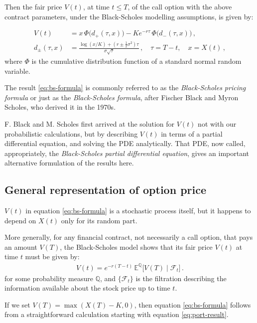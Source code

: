 \documentclass[12pt]{article}
\newcommand{\sF}{\mathcal{F}}
\newcommand{\EQ}{\mathbb{E}^\mathbb{Q}}
\newcommand{\PQ}{\mathbb{Q}}
\begin{document}
Then the fair price $V(t)$, at time $t \leq T$, of the 
call option with the above contract parameters,
under the Black-Scholes modelling assumptions,
is given by:

\begin{equation}\label{eq:bs-formula}
\begin{split}
V(t) &= x \, \Phi\bigl( d_+( \tau, x ) \bigr)
- K e^{-r\tau} \, \Phi\bigl( d_-(\tau, x) \bigr)\,, \\
d_\pm (\tau, x) &= \frac{ \log(x/K) + (r \pm \tfrac12 \sigma^2) \tau }{\sigma \sqrt{\tau} }\,, \quad \tau  = T-t, \quad x = X(t)\,,
\end{split}
\end{equation}
where $\Phi$ is the cumulative distribution function of a standard normal random variable.


The result \eqref{eq:bs-formula}
is commonly referred to as the \emph{Black-Scholes pricing formula}
or just as the \emph{Black-Scholes formula},
after Fischer Black and Myron Scholes, who derived it in the 1970s.

F. Black and M. Scholes first arrived at the solution for $V(t)$
not with our probabilistic calculations,
but by describing $V(t)$ in terms of a 
partial differential equation, and solving the PDE analytically.  
That PDE, now called, appropriately, 
the \emph{Black-Scholes partial differential equation},
gives an important alternative formulation of the results here.

\subsection{General representation of option price}

$V(t)$ in equation \eqref{eq:bs-formula} is a stochastic process itself, 
but it happens to depend on $X(t)$ only
for its random part.

More generally, for any financial contract, not necessarily
a call option, that pays an amount $V(T)$,
the Black-Scholes model shows that its fair price $V(t)$
at time $t$
must be given by:
\begin{align}\label{eq:port-result}
V(t) = e^{-r(T-t)} \, \EQ\bigl[V(T) \mid \sF_t\bigr]\,.
\end{align}
for some probability measure $\PQ$,
and $\{ \sF_t \}$ is the filtration
describing the information available about the stock price up to time $t$.

If we set $V(T)= \max(X(T)- K, 0)$, then 
equation \eqref{eq:bs-formula}
follows from a straightforward 
calculation starting with equation \eqref{eq:port-result}.
\end{document}
